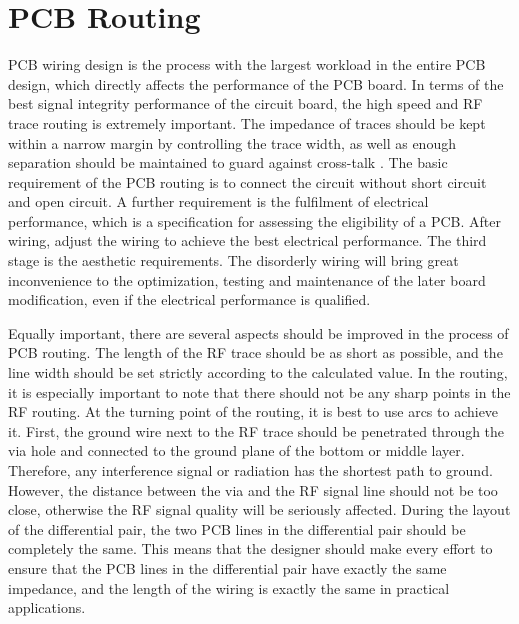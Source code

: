 \documentclass[12pt, a4paper]{report}
\begin{document}
\section{PCB Routing}

PCB wiring design is the process with the largest workload in the entire PCB design, which directly affects the performance of the PCB board. In terms of the best signal integrity performance of the circuit board, the high speed and RF trace routing is extremely important. The impedance of traces should be kept within a narrow margin by controlling the trace width, as well as enough separation should be maintained to guard against cross-talk \cite{ref:e0}. The basic requirement of the PCB routing is to connect the circuit without short circuit and open circuit. A further requirement is the fulfilment of electrical performance, which is a specification for assessing the eligibility of a PCB. After wiring, adjust the wiring to achieve the best electrical performance. The third stage is the aesthetic requirements. The disorderly wiring will bring great inconvenience to the optimization, testing and maintenance of the later board modification, even if the electrical performance is qualified.

Equally important, there are several aspects should be improved in the process of PCB routing. The length of the RF trace should be as short as possible, and the line width should be set strictly according to the calculated value. In the routing, it is especially important to note that there should not be any sharp points in the RF routing. At the turning point of the routing, it is best to use arcs to achieve it. First, the ground wire next to the RF trace should be penetrated through the via hole and connected to the ground plane of the bottom or middle layer. Therefore, any interference signal or radiation has the shortest path to ground. However, the distance between the via and the RF signal line should not be too close, otherwise the RF signal quality will be seriously affected. During the layout of the differential pair, the two PCB lines in the differential pair should be completely the same. This means that the designer should make every effort to ensure that the PCB lines in the differential pair have exactly the same impedance, and the length of the wiring is exactly the same in practical applications.
\end{document}
